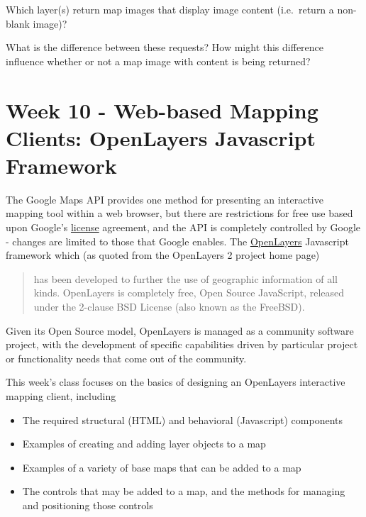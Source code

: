 \documentclass[]{book}
\providecommand{\tightlist}{%
  \setlength{\itemsep}{0pt}\setlength{\parskip}{0pt}}
\begin{document}
\begin{description}
\tightlist
\item[Question 6]
Which layer(s) return map images that display image content (i.e.~return
a non-blank image)?
\item[Questions 7]
What is the difference between these requests? How might this difference
influence whether or not a map image with content is being returned?
\end{description}

\chapter{Week 10 - Web-based Mapping Clients: OpenLayers Javascript
Framework}\label{week10}

The Google Maps API provides one method for presenting an interactive
mapping tool within a web browser, but there are restrictions for free
use based upon Google's
\href{https://developers.google.com/maps/licensing}{license} agreement,
and the API is completely controlled by Google - changes are limited to
those that Google enables. The \href{http://openlayers.org/}{OpenLayers}
Javascript framework which (as quoted from the OpenLayers 2 project home
page)

\begin{quote}
has been developed to further the use of geographic information of all
kinds. OpenLayers is completely free, Open Source JavaScript, released
under the 2-clause BSD License (also known as the FreeBSD).
\end{quote}

Given its Open Source model, OpenLayers is managed as a community
software project, with the development of specific capabilities driven
by particular project or functionality needs that come out of the
community.

This week's class focuses on the basics of designing an OpenLayers
interactive mapping client, including

\begin{itemize}
\tightlist
\item
  The required structural (HTML) and behavioral (Javascript) components
\item
  Examples of creating and adding layer objects to a map
\item
  Examples of a variety of base maps that can be added to a map
\item
  The controls that may be added to a map, and the methods for managing
  and positioning those controls
\end{itemize}
\end{document}
